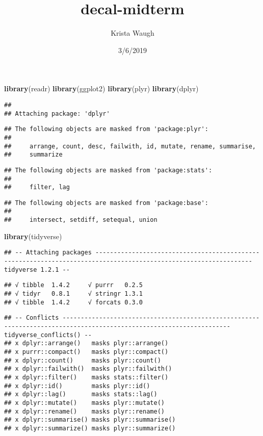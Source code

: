 \documentclass[]{article}
\title{decal-midterm}
\author{Krista Waugh}
\date{3/6/2019}
\newenvironment{Shaded}{\begin{snugshade}}{\end{snugshade}}
\newcommand{\KeywordTok}[1]{\textcolor[rgb]{0.13,0.29,0.53}{\textbf{#1}}}
\newcommand{\NormalTok}[1]{#1}
\begin{document}
\maketitle

\begin{Shaded}
\begin{Highlighting}[]
\KeywordTok{library}\NormalTok{(readr)}
\KeywordTok{library}\NormalTok{(ggplot2)}
\KeywordTok{library}\NormalTok{(plyr)}
\KeywordTok{library}\NormalTok{(dplyr)}
\end{Highlighting}
\end{Shaded}

\begin{verbatim}
## 
## Attaching package: 'dplyr'
\end{verbatim}

\begin{verbatim}
## The following objects are masked from 'package:plyr':
## 
##     arrange, count, desc, failwith, id, mutate, rename, summarise,
##     summarize
\end{verbatim}

\begin{verbatim}
## The following objects are masked from 'package:stats':
## 
##     filter, lag
\end{verbatim}

\begin{verbatim}
## The following objects are masked from 'package:base':
## 
##     intersect, setdiff, setequal, union
\end{verbatim}

\begin{Shaded}
\begin{Highlighting}[]
\KeywordTok{library}\NormalTok{(tidyverse)}
\end{Highlighting}
\end{Shaded}

\begin{verbatim}
## -- Attaching packages ----------------------------------------------------------------------------------------------------------------- tidyverse 1.2.1 --
\end{verbatim}

\begin{verbatim}
## √ tibble  1.4.2     √ purrr   0.2.5
## √ tidyr   0.8.1     √ stringr 1.3.1
## √ tibble  1.4.2     √ forcats 0.3.0
\end{verbatim}

\begin{verbatim}
## -- Conflicts -------------------------------------------------------------------------------------------------------------------- tidyverse_conflicts() --
## x dplyr::arrange()   masks plyr::arrange()
## x purrr::compact()   masks plyr::compact()
## x dplyr::count()     masks plyr::count()
## x dplyr::failwith()  masks plyr::failwith()
## x dplyr::filter()    masks stats::filter()
## x dplyr::id()        masks plyr::id()
## x dplyr::lag()       masks stats::lag()
## x dplyr::mutate()    masks plyr::mutate()
## x dplyr::rename()    masks plyr::rename()
## x dplyr::summarise() masks plyr::summarise()
## x dplyr::summarize() masks plyr::summarize()
\end{verbatim}
\end{document}
